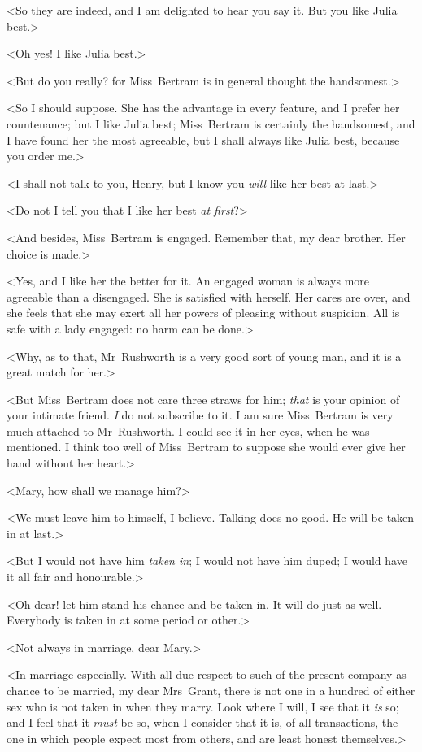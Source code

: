 <So they are indeed, and I am delighted to hear you say it. But you like Julia best.>

<Oh yes! I like Julia best.>

<But do you really? for Miss~Bertram is in general thought the handsomest.>

<So I should suppose. She has the advantage in every feature, and I prefer her countenance; but I like Julia best; Miss~Bertram is certainly the handsomest, and I have found her the most agreeable, but I shall always like Julia best, because you order me.>

<I shall not talk to you, Henry, but I know you \textit{will}  like her best at last.>

<Do not I tell you that I like her best \textit{at first}?>

<And besides, Miss~Bertram is engaged. Remember that, my dear brother. Her choice is made.>

<Yes, and I like her the better for it. An engaged woman is always more agreeable than a disengaged. She is satisfied with herself. Her cares are over, and she feels that she may exert all her powers of pleasing without suspicion. All is safe with a lady engaged: no harm can be done.>

<Why, as to that, Mr~Rushworth is a very good sort of young man, and it is a great match for her.>

<But Miss~Bertram does not care three straws for him; \textit{that}  is your opinion of your intimate friend. \textit{I}  do not subscribe to it. I am sure Miss~Bertram is very much attached to Mr~Rushworth. I could see it in her eyes, when he was mentioned. I think too well of Miss~Bertram to suppose she would ever give her hand without her heart.>

<Mary, how shall we manage him?>

<We must leave him to himself, I believe. Talking does no good. He will be taken in at last.>

<But I would not have him \textit{taken in}; I would not have him duped; I would have it all fair and honourable.>

<Oh dear! let him stand his chance and be taken in. It will do just as well. Everybody is taken in at some period or other.>

<Not always in marriage, dear Mary.>

<In marriage especially. With all due respect to such of the present company as chance to be married, my dear Mrs~Grant, there is not one in a hundred of either sex who is not taken in when they marry. Look where I will, I see that it \textit{is}  so; and I feel that it \textit{must}  be so, when I consider that it is, of all transactions, the one in which people expect most from others, and are least honest themselves.>

